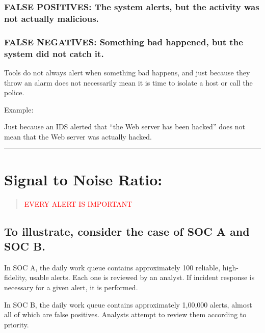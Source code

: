 \documentclass[british]{article}
\begin{document}
\subsubsection{FALSE POSITIVES: The system alerts, but the activity was not actually
malicious.}

\subsubsection{FALSE NEGATIVES: Something bad happened, but the system did not catch
it.}

Tools do not always alert when something bad happens, and just because
they throw an alarm does not necessarily mean it is time to isolate
a host or call the police.

Example:

Just because an IDS alerted that ``the Web server has been hacked''
does not mean that the Web server was actually hacked.

\rule[0.5ex]{0.75\columnwidth}{1pt}

\section{Signal to Noise Ratio:}
\begin{quotation}
\noindent \begin{center}
\textcolor{red}{\LARGE{}EVERY ALERT IS IMPORTANT}{\LARGE\par}
\par\end{center}
\begin{center}
 
\par\end{center}
\end{quotation}

\subsection{To illustrate, consider the case of SOC A and SOC B.}

In SOC A, the daily work queue contains approximately 100 reliable,
high-fidelity, usable alerts. Each one is reviewed by an analyst.
If incident response is necessary for a given alert, it is performed.

In SOC B, the daily work queue contains approximately 1,00,000 alerts,
almost all of which are false positives. Analysts attempt to review
them according to priority.
\end{document}
